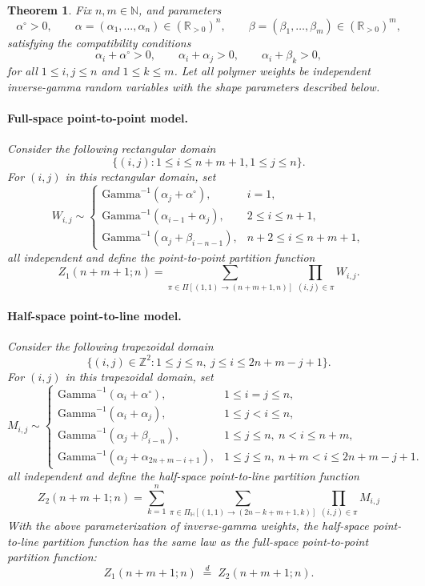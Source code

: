 \documentclass[11pt]{article}
\newtheorem{theorem}{Theorem}[section]
\theoremstyle{definition}
\newcommand{\HH}{\mathbb{H}}
\begin{document}
\begin{theorem}\label{thm:BW}
Fix $n,m\in\mathbb{N}$, and parameters
\[
\alpha^{\circ}>0,\qquad 
\alpha=(\alpha_1,\dots,\alpha_n)\in(\mathbb{R}_{>0})^n,\qquad
\beta=(\beta_1,\dots,\beta_m)\in(\mathbb{R}_{>0})^m,
\]
satisfying the compatibility conditions
\[
\alpha_i+\alpha^{\circ}>0,\qquad
\alpha_i+\alpha_j>0,\qquad
\alpha_i+\beta_k>0,
\]
for all $1\leq i,j \leq n$ and $1 \leq k \leq m$. Let all polymer weights be independent inverse-gamma 
random variables with the shape parameters described below.

\paragraph{Full-space point-to-point model.}
Consider the following rectangular domain
\[
\{(i,j): 1 \leq i \leq n+m+1, 1 \leq j \leq n\}.
\]
For $(i,j)$ in this rectangular domain, set
\[
W_{i,j}\sim
\begin{cases}
\mathrm{Gamma}^{-1}(\alpha_j+\alpha^{\circ}), & i=1,\\[3pt]
\mathrm{Gamma}^{-1}(\alpha_{i-1}+\alpha_{j}),   & 2\le i\le n+1,\\[3pt]
\mathrm{Gamma}^{-1}(\alpha_j+\beta_{i-n-1}), & n+2\le i\le n+m+1,
\end{cases}
\]
all independent and define the point-to-point partition function
\[
Z_1(n+m+1;n)
=\sum_{\pi\in\Pi[(1,1)\to(n+m+1,n)]}
\prod_{(i,j)\in\pi} W_{i,j}.
\]



\paragraph{Half-space point-to-line model.}
Consider the following trapezoidal domain
\[
\bigl\{(i,j)\in\mathbb{Z}^2: 
1\le j\le n,\ 
j\le i\le 2n+m-j+1 \bigr\}.
\]
For $(i,j)$ in this trapezoidal domain, set
\[
M_{i,j}\sim
\begin{cases}
\mathrm{Gamma}^{-1}(\alpha_i+\alpha^{\circ}), & 1\le i=j\le n,\\[3pt]
\mathrm{Gamma}^{-1}(\alpha_i+\alpha_j),      & 1\le j<i\le n,\\[3pt]
\mathrm{Gamma}^{-1}(\alpha_j+\beta_{i-n}),   & 1\le j\le n,\ n<i\le n+m,\\[3pt]
\mathrm{Gamma}^{-1}(\alpha_j+\alpha_{2n+m-i+1}), 
& 1\le j\le n,\ n+m<i\le 2n+m-j+1.
\end{cases}
\]
all independent and define the half-space point-to-line partition function
\[
Z_2(n+m+1;n)=\sum_{k=1}^n \sum_{\pi \in \Pi_{\HH}[(1,1) \to (2n-k+m+1,k)]} \prod_{(i,j) \in \pi} M_{i,j}
\]
With the above parameterization of inverse-gamma weights, the half-space
point-to-line partition function has the same law as the 
full-space point-to-point partition function:
\[
Z_1(n+m+1;n)\;\stackrel{d}{=}\;Z_2(n+m+1;n).
\]
\end{theorem}
\end{document}
